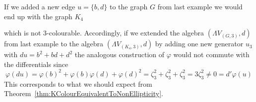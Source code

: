 \begin{Remark}
 If we added a new edge $ u = \lbrace b,d \rbrace$ to the graph $G$ from last example we would end up with the graph $K_4$ 
 \begin{center}
    

   \end{center}

 which
 is not $3$-colourable. Accordingly, if we extended the algebra $(\Lambda V_{(G,3)},d)$ from last example to the algebra
 $(\Lambda V_{(K_4,3)}, d)$ by adding one new generator $u_3$ with $du = b^2 + bd + d^2$ the analogous construction of $\varphi$ would
 not commute with the differentials since
 $$ \varphi(du) = \varphi(b)^2 + \varphi(b)\varphi(d) + \varphi(d)^2 = \zeta_3^2 + \zeta_3^2 + \zeta_3^2 = 3 \zeta_3^2 
 \neq 0 = d' \varphi(u)$$ 
 This corresponds to what we should expect from Theorem~\ref{thm:KColourEquivalentToNonEllipticity}.
\end{Remark}

